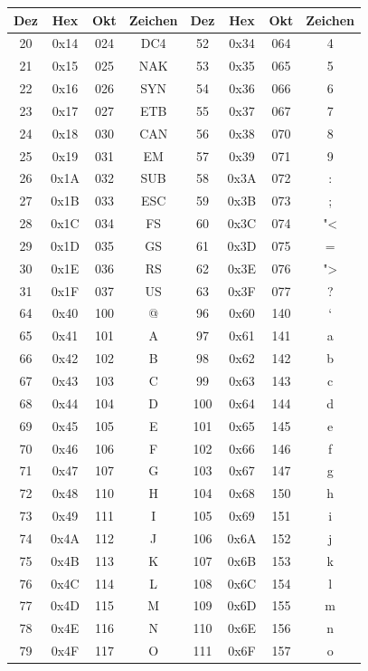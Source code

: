 \documentclass[%
<<<<<<< Updated upstream
11pt,%
twoside,%
titlepage,%
german,%
headsepline%
]{scrartcl}
\begin{document}
\begin{longtable}{|c|c|c|c||c|c|c|c|}
\hline
Dez & Hex & Okt & Zeichen & Dez & Hex & Okt & Zeichen\\
\hline
20 & 0x14 & 024 & DC4 & 52 & 0x34 & 064 & 4 \\
21 & 0x15 & 025 & NAK & 53 & 0x35 & 065 & 5 \\
22 & 0x16 & 026 & SYN & 54 & 0x36 & 066 & 6 \\
23 & 0x17 & 027 & ETB & 55 & 0x37 & 067 & 7 \\
24 & 0x18 & 030 & CAN & 56 & 0x38 & 070 & 8 \\
25 & 0x19 & 031 & EM & 57 & 0x39 & 071 & 9 \\
26 & 0x1A & 032 & SUB & 58 & 0x3A & 072 & : \\
27 & 0x1B & 033 & ESC & 59 & 0x3B & 073 & ; \\
28 & 0x1C & 034 & FS & 60 & 0x3C & 074 & "< \\
29 & 0x1D & 035 & GS & 61 & 0x3D & 075 & =\\
30 & 0x1E & 036 & RS & 62 & 0x3E & 076 & "> \\
31 & 0x1F & 037 & US & 63 & 0x3F & 077 & ? \\
64 & 0x40 & 100 & @ & 96 & 0x60 & 140 & ` \\
65 & 0x41 & 101 & A & 97 & 0x61 & 141 & a \\
66 & 0x42 & 102 & B & 98 & 0x62 & 142 & b \\
67 & 0x43 & 103 & C & 99 & 0x63 & 143 & c \\
68 & 0x44 & 104 & D & 100 & 0x64 & 144 & d \\
69 & 0x45 & 105 & E & 101 & 0x65 & 145 & e \\
70 & 0x46 & 106 & F & 102 & 0x66 & 146 & f \\
71 & 0x47 & 107 & G & 103 & 0x67 & 147 & g \\
72 & 0x48 & 110 & H & 104 & 0x68 & 150 & h \\
73 & 0x49 & 111 & I & 105 & 0x69 & 151 & i \\
74 & 0x4A & 112 & J & 106 & 0x6A & 152 & j \\
75 & 0x4B & 113 & K & 107 & 0x6B & 153 & k \\
76 & 0x4C & 114 & L & 108 & 0x6C & 154 & l \\
77 & 0x4D & 115 & M & 109 & 0x6D & 155 & m \\
78 & 0x4E & 116 & N & 110 & 0x6E & 156 & n \\
79 & 0x4F & 117 & O & 111 & 0x6F & 157 & o \\

\end{longtable}
\end{document}
